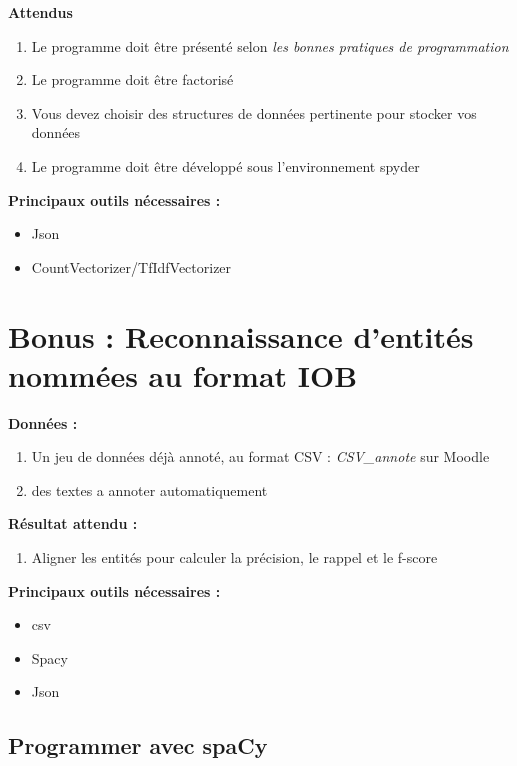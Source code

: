 \textbf{Attendus}
\begin{enumerate}
  \item Le programme doit être présenté selon \textit{les bonnes pratiques de programmation}
  \item Le programme doit être factorisé
  \item Vous devez choisir des structures de données pertinente pour stocker vos données
  \item Le programme doit être développé sous l'environnement spyder 
\end{enumerate}

\textbf{Principaux outils nécessaires :}
\begin{itemize}
  \item Json
  \item CountVectorizer/TfIdfVectorizer
\end{itemize}

\section{Bonus : Reconnaissance d'entités nommées au format IOB}

\textbf{Données :}
\begin{enumerate}
  \item Un jeu de données déjà annoté, au format CSV : \textit{CSV\_annote} sur Moodle
 \item des textes a annoter automatiquement 
\end{enumerate}

\textbf{Résultat attendu :}

\begin{enumerate}
  
  \item Aligner les entités pour calculer la précision, le rappel et le f-score
\end{enumerate}   
  


\textbf{Principaux outils nécessaires :}
\begin{itemize}
  \item csv 
  \item Spacy
  \item Json
  
\end{itemize}



\vspace{0.5cm}
\subsection*{Programmer avec spaCy}
\vspace{0.5cm}

